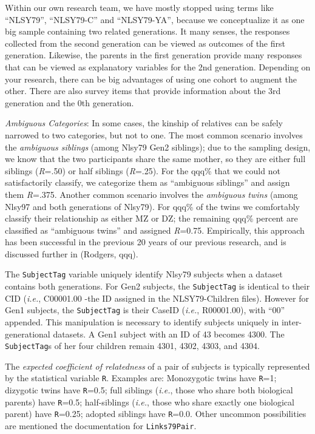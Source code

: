 \documentclass[smallextended]{svjour3}       %
\begin{document}
Within our own research team, we have mostly stopped using terms like
``NLSY79'', ``NLSY79-C'' and ``NLSY79-YA'', because we conceptualize it
as one big sample containing two related generations. It many senses,
the responses collected from the second generation can be viewed as
outcomes of the first generation. Likewise, the parents in the first
generation provide many responses that can be viewed as explanatory
variables for the 2nd generation. Depending on your research, there can
be big advantages of using one cohort to augment the other. There are
also survey items that provide information about the 3rd generation and
the 0th generation.

\emph{Ambiguous Categories}: In some cases, the kinship of relatives can
be safely narrowed to two categories, but not to one. The most common
scenario involves the \emph{ambiguous siblings} (among Nlsy79 Gen2
siblings); due to the sampling design, we know that the two participants
share the same mother, so they are either full siblings (\emph{R}=.50)
or half siblings (\emph{R}=.25). For the qqq\% that we could not
satisfactorily classify, we categorize them as ``ambiguous siblings''
and assign them \emph{R}=.375. Another common scenario involves the
\emph{ambiguous twins} (among Nlsy97 and both generations of Nlsy79).
For qqq\% of the twins we comfortably classify their relationship as
either MZ or DZ; the remaining qqq\% percent are classified as
``ambiguous twins'' and assigned \emph{R}=0.75. Empirically, this
approach has been successful in the previous 20 years of our previous
research, and is discussed further in (Rodgers, qqq).

The \texttt{SubjectTag} variable uniquely identify Nlsy79 subjects when
a dataset contains both generations. For Gen2 subjects, the
\texttt{SubjectTag} is identical to their CID (\emph{i.e.}, C00001.00
-the ID assigned in the NLSY79-Children files). However for Gen1
subjects, the \texttt{SubjectTag} is their CaseID (\emph{i.e.},
R00001.00), with ``00'' appended. This manipulation is necessary to
identify subjects uniquely in inter-generational datasets. A Gen1
subject with an ID of 43 becomes 4300. The \texttt{SubjectTag}s of her
four children remain 4301, 4302, 4303, and 4304.

The \emph{expected coefficient of relatedness} of a pair of subjects is
typically represented by the statistical variable \texttt{R}. Examples
are: Monozygotic twins have \texttt{R}=1; dizygotic twins have
\texttt{R}=0.5; full siblings (\emph{i.e.}, those who share both
biological parents) have \texttt{R}=0.5; half-siblings (\emph{i.e.},
those who share exactly one biological parent) have \texttt{R}=0.25;
adopted siblings have \texttt{R}=0.0. Other uncommon possibilities are
mentioned the documentation for \texttt{Links79Pair}.
\end{document}
